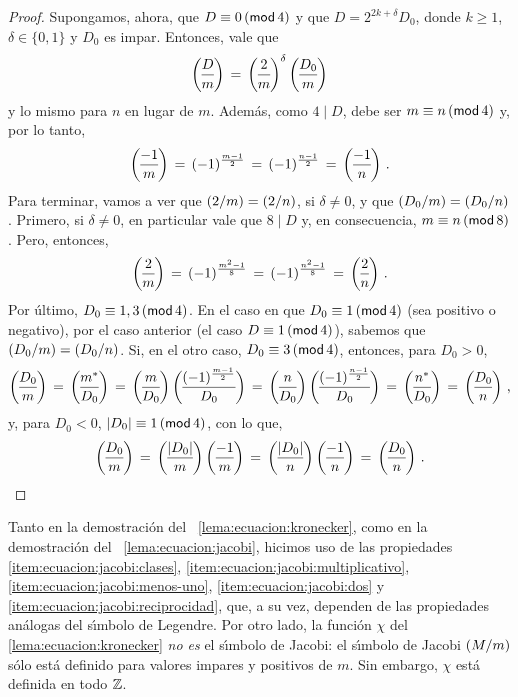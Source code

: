 \begin{proof}
	Supongamos, ahora, que $D\equiv 0\tmodulo[4]$ y que
	$D=2^{2k+\delta}D_0$, donde $k\geq 1$, $\delta\in\{0,1\}$ y $D_0$ es
	impar. Entonces, vale que
	\begin{displaymath}
		\jacobi D{m}\,=\,\jacobi 2{m}^\delta\,\jacobi{D_0} m
	\end{displaymath}
	y lo mismo para $n$ en lugar de $m$. Adem\'as, como $4\mid D$,
	debe ser $m\equiv n\tmodulo[4]$ y, por lo tanto,
	\begin{displaymath}
		\jacobi{-1} m\,=\,(-1)^{\frac{m-1} 2}\,=\,
			(-1)^{\frac{n-1} 2}\,=\,\jacobi{-1} n
		\text{ .}
	\end{displaymath}
	Para terminar, vamos a ver que $\tjacobi 2{m}=\tjacobi 2{n}$, si
	$\delta\neq 0$, y que $\tjacobi{D_0} m=\tjacobi{D_0} n$.
	Primero, si $\delta\neq 0$, en particular vale que $8\mid D$ y,
	en consecuencia, $m\equiv n\tmodulo[8]$. Pero, entonces,
	\begin{displaymath}
		\jacobi 2{m}\,=\,(-1)^{\frac{m^2-1} 8}\,=\,
			(-1)^{\frac{n^2-1} 8}\,=\,\jacobi 2{n}
		\text{ .}
	\end{displaymath}
	Por \'ultimo, $D_0\equiv 1,3\tmodulo[4]$. En el caso en que
	$D_0\equiv 1\tmodulo[4]$ (sea positivo o negativo), por el caso
	anterior (el caso $D\equiv 1\tmodulo[4]$), sabemos que
	$\tjacobi{D_0} m=\tjacobi{D_0} n$. Si, en el otro caso,
	$D_0\equiv 3\tmodulo[4]$, entonces, para $D_0>0$,
	\begin{displaymath}
		\jacobi{D_0} m\,=\,\jacobi{m^*}{D_0}\,=\,
		\jacobi m{D_0}\,\jacobi{(-1)^{\frac{m-1} 2}}{D_0}\,=\,
		\jacobi n{D_0}\,\jacobi{(-1)^{\frac{n-1} 2}}{D_0}\,=\,
		\jacobi{n^*}{D_0}\,=\,\jacobi{D_0} n
		\text{ ,}
	\end{displaymath}
	y, para $D_0<0$, $|D_0|\equiv 1\tmodulo[4]$, con lo que,
	\begin{displaymath}
		\jacobi{D_0} m\,=\,\jacobi{|D_0|} m\,\jacobi{-1} m\,=\,
		\jacobi{|D_0|} n\,\jacobi{-1} n\,=\,\jacobi{D_0} n
		\text{ .}
	\end{displaymath}
\end{proof}

\begin{obsEcuacion}\label{obs:ecuacion:kronecker}
	Tanto en la demostraci\'on del \lemaname~\ref{lema:ecuacion:kronecker},
	como en la demostraci\'on del \lemaname~\ref{lema:ecuacion:jacobi},
	hicimos uso de las propiedades
	\eqref{item:ecuacion:jacobi:clases},
	\eqref{item:ecuacion:jacobi:multiplicativo},
	\eqref{item:ecuacion:jacobi:menos-uno},
	\eqref{item:ecuacion:jacobi:dos} y
	\eqref{item:ecuacion:jacobi:reciprocidad},
	que, a su vez, dependen de las propiedades an\'alogas del s\'{\i}mbolo
	de Legendre.
	Por otro lado, la funci\'on $\chi$ del \lemaname~%
	\ref{lema:ecuacion:kronecker} \emph{no es} el s\'{\i}mbolo de Jacobi:
	el s\'{\i}mbolo de Jacobi $\tjacobi M{m}$ s\'olo est\'a definido para
	valores impares y positivos de $m$. Sin embargo, $\chi$ est\'a
	definida en todo $\Enteros$.
\end{obsEcuacion}

